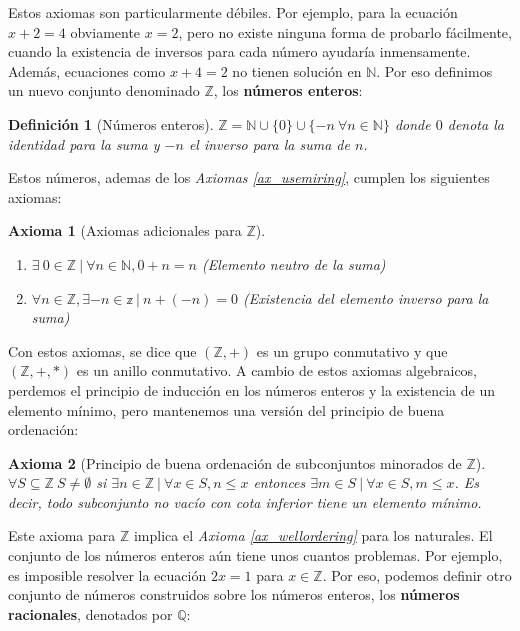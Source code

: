 \documentclass{article}
\newtheorem{axiom}{Axioma}
\newtheorem{define}{Definición}
\begin{document}
Estos axiomas son particularmente débiles. Por ejemplo, para la ecuación $x + 2 = 4$ obviamente $x = 2$, pero no existe ninguna forma de probarlo fácilmente, cuando la existencia de inversos para cada número ayudaría inmensamente. Además, ecuaciones como $x + 4 = 2$ no tienen solución en $\mathbb{N}$. Por eso definimos un nuevo conjunto denominado $\mathbb{Z}$, los \textbf{números enteros}:

\begin{define}[Números enteros]
$\mathbb{Z} = \mathbb{N} \cup \{0\} \cup \{-n\ \forall n \in \mathbb{N} \}$ donde $0$ denota la identidad para la suma y $-n$ el inverso para la suma de $n$. 
\end{define}

Estos números, ademas de los \textit{Axiomas \ref{ax_usemiring}}, cumplen los siguientes axiomas:

\begin{axiom}[Axiomas adicionales para $\mathbb{Z}$]\ 
\label{ax_additionalz}
\begin{enumerate}
	\item
	$\exists\ 0 \in \mathbb{Z}\ |\ \forall n \in \mathbb{N},0+n = n$ (Elemento neutro de la suma)
	\item
	$\forall n \in \mathbb{Z},\exists -n \in \mathbb{z}\ |\ n+(-n)=0$ (Existencia del elemento inverso para la suma)
\end{enumerate}
\end{axiom}
Con estos axiomas, se dice que $(\mathbb{Z}, +)$ es un grupo conmutativo y que $(\mathbb{Z}, +, *)$ es un anillo conmutativo. A cambio de estos axiomas algebraicos, perdemos el principio de inducción en los números enteros y la existencia de un elemento mínimo, pero mantenemos una versión del principio de buena ordenación:

\begin{axiom}[Principio de buena ordenación de subconjuntos minorados de $\mathbb{Z}$]\ 
$\forall S \subseteq \mathbb{Z}\ S \neq \emptyset$ si $\exists n \in \mathbb{Z}\ |\ \forall x \in S,n\leq x$ entonces $\exists m \in S\ |\ \forall x \in S,m\leq x$. Es decir, todo subconjunto no vacío con cota inferior tiene un elemento mínimo.
\end{axiom}

Este axioma para $\mathbb{Z}$ implica el \textit{Axioma \ref{ax_wellordering}} para los naturales.
El conjunto de los números enteros aún tiene unos cuantos problemas. Por ejemplo, es imposible resolver la ecuación $2x=1$ para $x\in \mathbb{Z}$. Por eso, podemos definir otro conjunto de números construidos sobre los números enteros, los \textbf{números racionales}, denotados por $\mathbb{Q}$:
\end{document}
